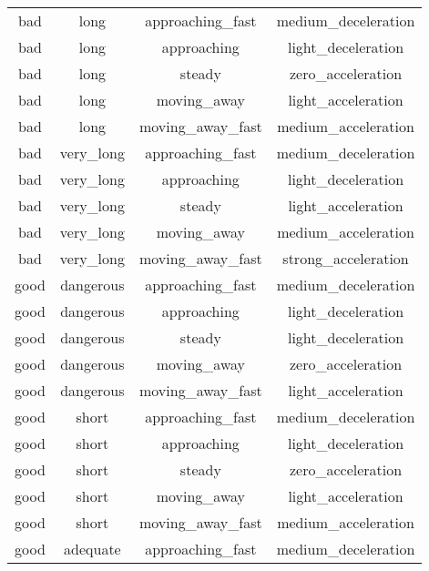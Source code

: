 \begin{table}[!htbp]
\begin{tabular}{|c|c|c|c|}
            bad       & long        & approaching\_fast     & medium\_deceleration \\
            bad       & long        & approaching          & light\_deceleration \\
            bad       & long        & steady               & zero\_acceleration \\
            bad       & long        & moving\_away         & light\_acceleration \\
            bad       & long        & moving\_away\_fast   & medium\_acceleration \\
            bad       & very\_long  & approaching\_fast     & medium\_deceleration \\
            bad       & very\_long  & approaching          & light\_deceleration \\
            bad       & very\_long  & steady               & light\_acceleration \\
            bad       & very\_long  & moving\_away         & medium\_acceleration \\
            bad       & very\_long  & moving\_away\_fast   & strong\_acceleration \\
            good      & dangerous   & approaching\_fast     & medium\_deceleration \\
            good      & dangerous   & approaching          & light\_deceleration \\
            good      & dangerous   & steady               & light\_deceleration \\
            good      & dangerous   & moving\_away         & zero\_acceleration \\
            good      & dangerous   & moving\_away\_fast   & light\_acceleration \\
            good      & short       & approaching\_fast     & medium\_deceleration \\
            good      & short       & approaching          & light\_deceleration \\
            good      & short       & steady               & zero\_acceleration \\
            good      & short       & moving\_away         & light\_acceleration \\
            good      & short       & moving\_away\_fast   & medium\_acceleration \\
            good      & adequate    & approaching\_fast     & medium\_deceleration \\

\end{tabular}
\end{table}
